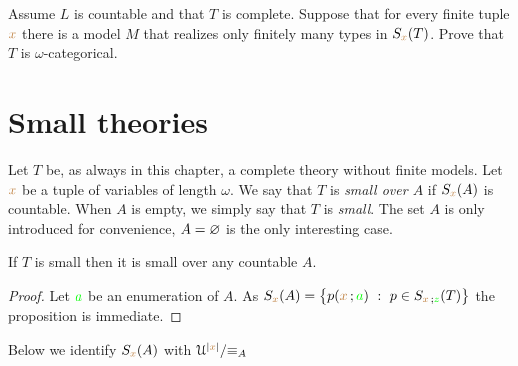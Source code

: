 \documentclass[creche.tex]{subfiles}
\begin{document}
\begin{exercise} 
Assume $L$ is countable and that $T$ is complete. Suppose that for every finite tuple  ${\color{brown} x}$ there is a model $M$ that realizes only finitely many types in $S_{\color{brown} x}(T)$. Prove that $T$ is $\omega$-categorical.
\end{exercise}
\section{Small theories}

\def\ceq#1#2#3{\parbox[b]{15ex}{$\displaystyle #1$}\parbox[b]{6ex}{\hfil$#2$}$\displaystyle #3$}


Let $T$ be, as always in this chapter, a complete theory without finite models. Let ${\color{brown} x}$ be a tuple of variables of length $\omega$. We say that $T$ is \emph{small over $A$\/} if $S_{\color{brown} x}(A)$ is countable. When $A$ is empty, we simply say that  $T$ is \emph{small}. The set $A$ is only introduced for convenience, $A=\varnothing$ is the only interesting case. 

\begin{proposition}
If $T$ is small then it is small over any countable $A$.
\end{proposition}

\begin{proof}
Let ${\color{green} a}$ be an enumeration of $A$. As $S_{\mr x}(A)=\big\{p({\mr x}\,;{\gr a})\ :\ p\in S_{{\mr x}\,;{\gr z}}(T)\big\}$ the proposition is immediate.
\end{proof}

Below we identify $S_{\color{brown} x}(A)$ with $\EuScript U^{|{\color{brown} x}|}/\mathord\equiv_A$
\end{document}
